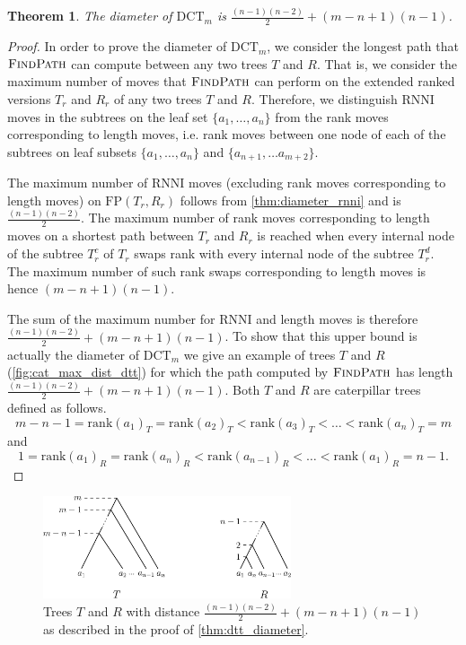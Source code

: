 \documentclass[11pt]{amsart}
\newtheorem{theorem}{Theorem}
\newcommand{\rnni}{\mathrm{RNNI}}
\newcommand{\findpath}{\textsc{FindPath}}
\newcommand{\rank}{\mathrm{rank}}
\newcommand{\fp}{\mathrm{FP}}
\newcommand{\dtt}{\mathrm{DCT}}
\begin{document}
\begin{theorem}
	The diameter of $\dtt_m$ is $\frac{(n-1)(n-2)}{2} + (m-n+1)(n-1)$.
	\label{thm:dtt_diameter}
\end{theorem}

\begin{proof}
	In order to prove the diameter of $\dtt_m$, we consider the longest path that $\findpath$ can compute between any two trees $T$ and $R$.
	That is, we consider the maximum number of moves that $\findpath$ can perform on the extended ranked versions $T_r$ and $R_r$ of any two trees $T$ and $R$.
	Therefore, we distinguish $\rnni$ moves in the subtrees on the leaf set $\{a_1, \ldots, a_n\}$ from the rank moves corresponding to length moves, i.e. rank moves between one node of each of the subtrees on leaf subsets $\{a_1, \ldots, a_n\}$ and $\{a_{n+1}, \ldots a_{m+2}\}$.

	The maximum number of $\rnni$ moves (excluding rank moves corresponding to length moves) on $\fp(T_r,R_r)$ follows from \autoref{thm:diameter_rnni} and is $\frac{(n-1)(n-2)}{2}$.
	The maximum number of rank moves corresponding to length moves on a shortest path between $T_r$ and $R_r$ is reached when every internal node of the subtree $T_r^c$ of $T_r$ swaps rank with every internal node of the subtree $T_r^d$.
	The maximum number of such rank swaps corresponding to length moves is hence $(m-n+1)(n-1)$.

	The sum of the maximum number for $\rnni$ and length moves is therefore $\frac{(n-1)(n-2)}{2} + (m-n+1)(n-1)$.
	To show that this upper bound is actually the diameter of $\dtt_m$ we give an example of trees $T$ and $R$ (\autoref{fig:cat_max_dist_dtt}) for which the path computed by $\findpath$ has length $\frac{(n-1)(n-2)}{2} + (m-n+1)(n-1)$.
	Both $T$ and $R$ are caterpillar trees defined as follows.
	\[m-n-1 = \rank(a_1)_T = \rank(a_2)_T < \rank(a_3)_T < \ldots < \rank(a_n)_T = m\]
	and
	\[1 = \rank(a_1)_R = \rank(a_n)_R < \rank(a_{n-1})_R < \ldots < \rank(a_1)_R = n-1.\]
\end{proof}

\begin{figure}[ht]
	\includegraphics[width=0.65\textwidth]{cat_max_dist_dtt.eps}
	\caption{Trees $T$ and $R$ with distance $\frac{(n-1)(n-2)}{2} + (m-n+1)(n-1)$ as described in the proof of \autoref{thm:dtt_diameter}.}
	\label{fig:cat_max_dist_dtt}
\end{figure}
\end{document}

